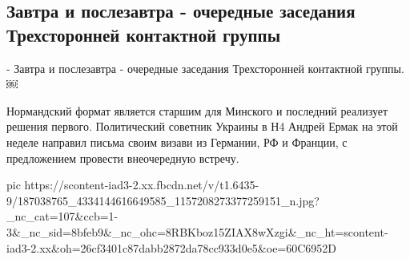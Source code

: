  
 
 
 
 
\subsection{Завтра и послезавтра - очередные заседания Трехсторонней контактной группы}
\label{sec:17_05_2021.fb.arestovich_aleksej.2.tkg_rossia_ukraina}

- Завтра и послезавтра - очередные заседания Трехсторонней контактной группы.￼

Нормандский формат является старшим для Минского и последний реализует решения первого. 
Политический советник Украины в Н4 Андрей Ермак на этой неделе направил письма своим визави из Германии, РФ и Франции, с предложением провести внеочередную встречу.

\ifcmt
  pic https://scontent-iad3-2.xx.fbcdn.net/v/t1.6435-9/187038765_4334144616649585_1157208273377259151_n.jpg?_nc_cat=107&ccb=1-3&_nc_sid=8bfeb9&_nc_ohc=8RBKboz15ZIAX8wXzgi&_nc_ht=scontent-iad3-2.xx&oh=26cf3401c87dabb2872da78cc933d0e5&oe=60C6952D
\fi

